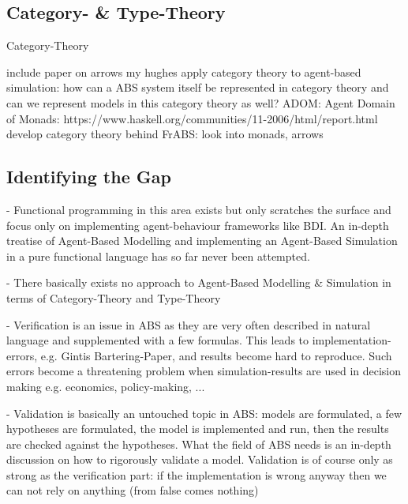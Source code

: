 \subsection{Category- \& Type-Theory}
Category-Theory \cite{Pierce1991} \cite{spivak_category_2014}

include paper on arrows my hughes
apply category theory to agent-based simulation: how can a ABS system itself be represented in category theory and can we represent models in this category theory as well?
ADOM: Agent Domain of Monads: https://www.haskell.org/communities/11-2006/html/report.html
develop category theory behind FrABS: look into monads, arrows


\subsection{Identifying the Gap}
- Functional programming in this area exists but only scratches the surface and focus only on implementing agent-behaviour frameworks like BDI. An in-depth treatise of Agent-Based Modelling and implementing an Agent-Based Simulation in a pure functional language has so far never been attempted.

- There basically exists no approach to Agent-Based Modelling \& Simulation in terms of Category-Theory and Type-Theory

- Verification is an issue in ABS as they are very often described in natural language and supplemented with a few formulas. This leads to implementation-errors, e.g. Gintis Bartering-Paper, and results become hard to reproduce. Such errors become a threatening problem when simulation-results are used in decision making e.g. economics, policy-making, ...

- Validation is basically an untouched topic in ABS: models are formulated, a few hypotheses are formulated, the model is implemented and run, then the results are checked against the hypotheses. What the field of ABS needs is an in-depth discussion on how to rigorously validate a model. Validation is of course only as strong as the verification part: if the implementation is wrong anyway then we can not rely on anything (from false comes nothing)